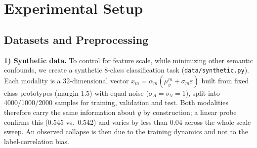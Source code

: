 \documentclass[conference]{IEEEtran}
\begin{document}
\section{Experimental Setup}

\begin{table}[!t]
\centering
\caption{Experimental Setup and Hyperparameters}
\label{tab:hyperparams}
\renewcommand{\arraystretch}{1.1}
\end{table}

\subsection{Datasets and Preprocessing}
\textbf{1) Synthetic data.} To control for feature scale, while minimizing other semantic confounds, we create a synthetic 8-class classification task (\texttt{data/synthetic.py}). Each modality is a 32-dimensional vector $x_m = \alpha_m(\mu_y^m + \sigma_m \varepsilon)$ built from fixed class prototypes (margin 1.5) with equal noise ($\sigma_A = \sigma_V = 1$), split into 4000/1000/2000 samples for training, validation and test. Both modalities therefore carry the same information about $y$ by construction; a linear probe confirms this (0.545 vs.\ 0.542) and varies by less than 0.04 across the whole scale sweep. An observed collapse is then due to the training dynamics and not to the label-correlation bias.
\end{document}
